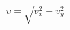 \documentclass[preview]{standalone}
\begin{document}
\begin{align*}
v = \sqrt{v_x^2 + v_y^2}
\end{align*}
\end{document}
